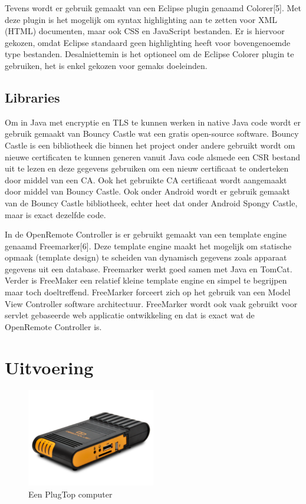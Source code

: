 \documentclass[]{article}
\begin{document}
Tevens wordt er gebruik gemaakt van een Eclipse plugin genaamd Colorer[5].
Met deze plugin is het mogelijk om syntax highlighting aan te zetten voor
XML (HTML) documenten, maar ook CSS en JavaScript bestanden. Er is hiervoor
gekozen, omdat Eclipse standaard geen highlighting heeft voor bovengenoemde
type bestanden. Desalniettemin is het optioneel om de Eclipse Colorer
plugin te gebruiken, het is enkel gekozen voor gemaks doeleinden.

\subsection{Libraries}
Om in Java met encryptie en TLS te kunnen werken in native Java code wordt
er gebruik gemaakt van Bouncy Castle wat een gratis open-source software.
Bouncy Castle is een bibliotheek die binnen het project onder andere
gebruikt wordt om nieuwe certificaten te kunnen generen vanuit Java code
alsmede een CSR bestand uit te lezen en deze gegevens gebruiken om een
nieuw certificaat te onderteken door middel van een CA. Ook het gebruikte
CA certificaat wordt aangemaakt door middel van Bouncy Castle. Ook onder 
Android wordt er gebruik gemaakt van de Bouncy Castle bibliotheek, echter 
heet dat onder Android Spongy Castle, maar is exact dezelfde code.

In de OpenRemote Controller is er gebruikt gemaakt van een template engine
genaamd Freemarker[6]. Deze template engine maakt het mogelijk om statische
opmaak (template design) te scheiden van dynamisch gegevens zoals apparaat
gegevens uit een database. Freemarker werkt goed samen met Java en TomCat.
Verder is FreeMaker een relatief kleine template engine en simpel te
begrijpen maar toch doeltreffend. FreeMarker forceert zich op het gebruik
van een Model View Controller software architectuur. FreeMarker wordt ook
vaak gebruikt voor servlet gebaseerde web applicatie ontwikkeling en dat is
exact wat de OpenRemote Controller is.

\newpage
\section{Uitvoering}

\begin{figure}
  \begin{center}
    \includegraphics[width=0.50\textwidth]{dreamplug.pdf}
  \end{center}
  \caption{Een PlugTop computer}
\end{figure}
\end{document}
